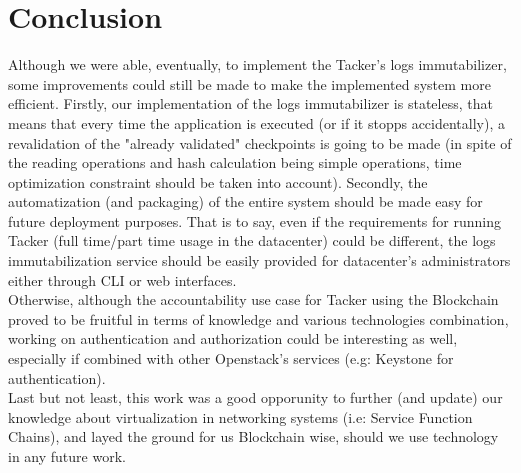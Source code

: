 \section{Conclusion}
Although we were able, eventually, to implement the Tacker's logs immutabilizer, some improvements could still be made to make the implemented system more efficient. Firstly, our implementation of the logs immutabilizer is stateless, that means that every time the application is executed (or if it stopps accidentally), a revalidation of the "already validated" checkpoints is going to be made (in spite of the reading operations and hash calculation being simple operations, time optimization constraint should be taken into account). Secondly, the automatization (and packaging) of the entire system should be made easy for future deployment purposes. That is to say, even if the requirements for running Tacker (full time/part time usage in the datacenter) could be different, the logs immutabilization service should be easily provided for datacenter's administrators either through CLI or web interfaces.\\
Otherwise, although the accountability use case for Tacker using the Blockchain proved to be fruitful in terms of knowledge and various technologies combination, working on authentication and authorization could be interesting as well, especially if combined with other Openstack's services (e.g: Keystone for authentication).\\
Last but not least, this work was a good opporunity to further (and update) our knowledge  about virtualization in networking systems (i.e: Service Function Chains), and layed the ground for us Blockchain wise, should we use technology in any future work.